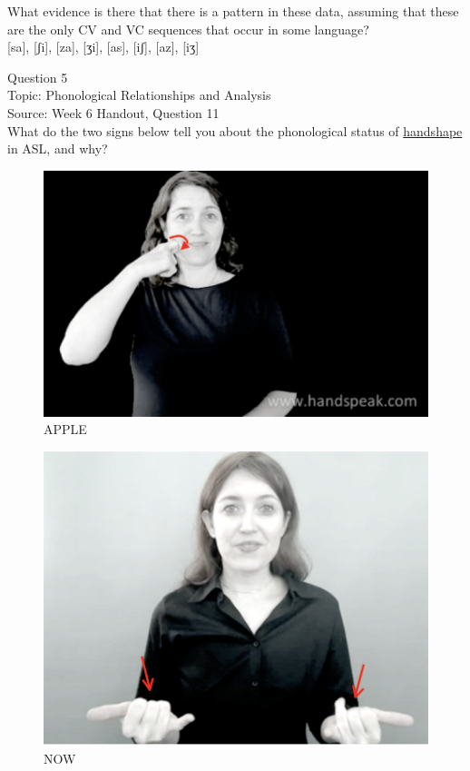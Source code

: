 \documentclass[12pt]{article}
\begin{document}
What evidence is there that there is a pattern in these data, assuming that these are the only CV and VC sequences that occur in some language?\\

{[sa]}, {[ʃi]}, {[za]}, {[ʒi]}, {[as]}, {[iʃ]}, {[az]}, {[iʒ]}


\newpage

{\large Question 5}\\

Topic: Phonological Relationships and Analysis\\
Source: Week 6 Handout, Question 11\\

What do the two signs below tell you about the phonological status of \underline{handshape} in ASL, and why?\\

\begin{figure}[H]
\includegraphics{../images/asl_apple.png}
\caption{APPLE}
\end{figure}
\begin{figure}[H]
\includegraphics{../images/asl_now.png}
\caption{NOW}
\end{figure}
\end{document}

